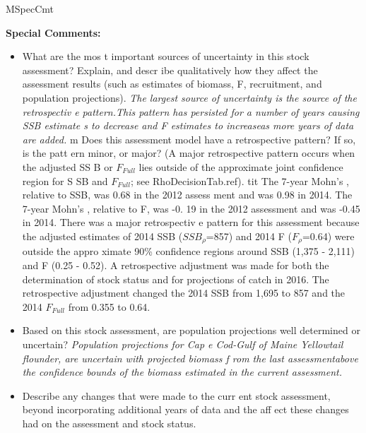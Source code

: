 MSpecCmt{ \textbf{Special Comments: } \begin{itemize}{} \item{}What are the mos
t important sources of uncertainty in this stock assessment? Explain, and descr
ibe qualitatively how they affect the assessment results (such as estimates of 
biomass, F, recruitment, and population projections). \linebreak{} \hspace*{0.5
cm} \textit{The largest source of uncertainty is the source of the retrospectiv
e pattern.This pattern has persisted for a number of years causing SSB estimate
s to decrease and F estimates to increaseas more years of data are added.} \ite
m{} Does this assessment model have a retrospective pattern? If so, is the patt
ern minor, or major? (A major retrospective pattern occurs when the adjusted SS
B or $F_{Full}${} lies outside of the approximate joint confidence region for S
SB and $F_{Full}${}; see RhoDecisionTab.ref). \linebreak{} \hspace*{0.5cm} \tex
tit{ The 7-year Mohn's \textrho{}, relative to SSB, was 0.68 in the 2012 assess
ment and was 0.98 in 2014. The 7-year Mohn's \textrho{}, relative to F, was -0.
19 in the 2012 assessment and was -0.45 in 2014. There was a major retrospectiv
e pattern for this assessment because the \textrho{} adjusted estimates of 2014
 SSB ($SSB_{\rho}${}=857) and 2014 F ($F_{\rho}${}=0.64) were outside the appro
ximate 90\% confidence regions around SSB (1,375 - 2,111) and F (0.25 - 0.52). 
A retrospective adjustment was made for both the determination of stock status 
and for projections of catch in 2016. The retrospective adjustment changed the 
2014 SSB from 1,695 to 857 and the 2014 $F_{Full}${} from 0.355 to 0.64.} \item
{}Based on this stock assessment, are population projections well determined or
 uncertain? \linebreak{} \hspace*{0.5cm} \textit{Population projections for Cap
e Cod-Gulf of Maine Yellowtail flounder, are uncertain with projected biomass f
rom the last assessmentabove the confidence bounds of the biomass estimated in 
the current assessment.} \item{}Describe any changes that were made to the curr
ent stock assessment, beyond incorporating additional years of data and the aff
ect these changes had on the assessment and stock status. \linebreak{} \hspace*

\end{itemize}}
